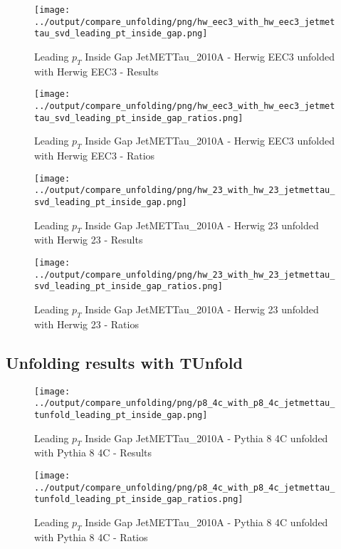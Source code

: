 \documentclass[11pt]{book}
\begin{document}
\begin{figure}[ht]
\centering
\texttt{[image: ../output/compare\_unfolding/png/hw\_eec3\_with\_hw\_eec3\_jetmettau\_svd\_leading\_pt\_inside\_gap.png]}
\caption{Leading $p_{T}$ Inside Gap JetMETTau\_2010A - Herwig EEC3 unfolded with Herwig EEC3 - Results}
\label{hw_eec3_hw_eec3_jetmettau_svd_leading_pt_inside_gap_a}
\end{figure}

\begin{figure}[ht]
\centering
\texttt{[image: ../output/compare\_unfolding/png/hw\_eec3\_with\_hw\_eec3\_jetmettau\_svd\_leading\_pt\_inside\_gap\_ratios.png]}
\caption{Leading $p_{T}$ Inside Gap JetMETTau\_2010A - Herwig EEC3 unfolded with Herwig EEC3 - Ratios}
\label{hw_eec3_hw_eec3_jetmettau_svd_leading_pt_inside_gap_b}
\end{figure}

\begin{figure}[ht]
\centering
\texttt{[image: ../output/compare\_unfolding/png/hw\_23\_with\_hw\_23\_jetmettau\_svd\_leading\_pt\_inside\_gap.png]}
\caption{Leading $p_{T}$ Inside Gap JetMETTau\_2010A - Herwig 23 unfolded with Herwig 23 - Results}
\label{hw_23_hw_23_jetmettau_svd_leading_pt_inside_gap_a}
\end{figure}

\begin{figure}[ht]
\centering
\texttt{[image: ../output/compare\_unfolding/png/hw\_23\_with\_hw\_23\_jetmettau\_svd\_leading\_pt\_inside\_gap\_ratios.png]}
\caption{Leading $p_{T}$ Inside Gap JetMETTau\_2010A - Herwig 23 unfolded with Herwig 23 - Ratios}
\label{hw_23_hw_23_jetmettau_svd_leading_pt_inside_gap_b}
\end{figure}


\clearpage
\subsection{Unfolding results with TUnfold}

\begin{figure}[ht]
\centering
\texttt{[image: ../output/compare\_unfolding/png/p8\_4c\_with\_p8\_4c\_jetmettau\_tunfold\_leading\_pt\_inside\_gap.png]}
\caption{Leading $p_{T}$ Inside Gap JetMETTau\_2010A - Pythia 8 4C unfolded with Pythia 8 4C - Results}
\label{p8_p8_jetmettau_tunfold_leading_pt_inside_gap_a}
\end{figure}

\begin{figure}[ht]
\centering
\texttt{[image: ../output/compare\_unfolding/png/p8\_4c\_with\_p8\_4c\_jetmettau\_tunfold\_leading\_pt\_inside\_gap\_ratios.png]}
\caption{Leading $p_{T}$ Inside Gap JetMETTau\_2010A - Pythia 8 4C unfolded with Pythia 8 4C - Ratios}
\label{p8_p8_jetmettau_tunfold_leading_pt_inside_gap_b}
\end{figure}
\end{document}
